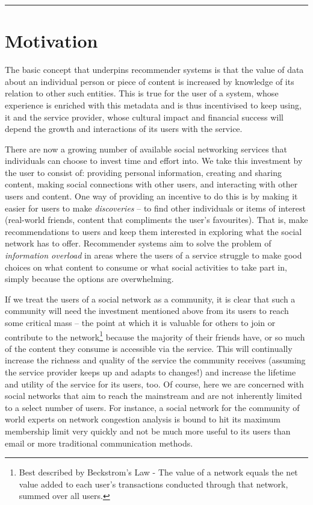 \documentclass[a4paper,12pt,twoside,notitlepage]{report}
\newcommand{\rulewidth}{300pt}
\newcommand{\halfrule}{
  \begin{center}
    {\rule{\rulewidth}{0.5pt}}
  \end{center}}
\begin{document}
\halfrule

\section{Motivation}

The basic concept that underpins recommender systems is that the value of data
about an individual person or piece of content is increased by knowledge of its
relation to other such entities. This is true for the user of a system, whose
experience is enriched with this metadata and is thus incentivised to keep
using, it and the service provider, whose cultural impact and financial success
will depend the growth and interactions of its users with the service.

There are now a growing number of available social networking services that
individuals can choose to invest time and effort into. We take this investment
by the user to consist of: providing personal information, creating and sharing
content, making social connections with other users, and interacting with other
users and content. One way of providing an incentive to do this is by making it
easier for users to make \emph{discoveries} -- to find other individuals or
items of interest (real-world friends, content that compliments the user's
favourites). That is, make recommendations to users and keep them interested in
exploring what the social network has to offer. Recommender systems aim
to solve the problem of \emph{information overload} in areas where the users of
a service struggle to make good choices on what content to consume or what
social activities to take part in, simply because the options are overwhelming.

If we treat the users of a social network as a community, it is clear that such
a community will need the investment mentioned above from its users to reach
some critical mass -- the point at which it is valuable for others to join 
or contribute to the network\footnote{Best described by Beckstrom's Law - The
value of a network equals the net value added to each user's transactions
conducted through that network, summed over all users.} because the majority of
their friends have, or so much of the content they consume is accessible via the
service. This will continually increase the richness and quality of the service
the community receives (assuming the service provider keeps up and adapts to
changes!) and increase the lifetime and utility of the service for its users,
too. Of course, here we are concerned with social networks that aim to reach the
mainstream and are not inherently limited to a select number of users. For
instance, a social network for the community of world experts on network
congestion analysis is bound to hit its maximum membership limit very quickly
and not be much more useful to its users than email or more traditional
communication methods.
\end{document}
